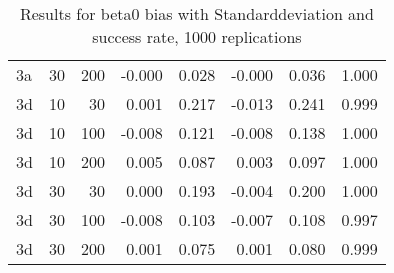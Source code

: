 \begin{table}[ht]
\begin{tabular}{lrrrrrrr}
  3a & 30 & 200 & -0.000 & 0.028 & -0.000 & 0.036 & 1.000 \\ 
  3d & 10 & 30 & 0.001 & 0.217 & -0.013 & 0.241 & 0.999 \\ 
  3d & 10 & 100 & -0.008 & 0.121 & -0.008 & 0.138 & 1.000 \\ 
  3d & 10 & 200 & 0.005 & 0.087 & 0.003 & 0.097 & 1.000 \\ 
  3d & 30 & 30 & 0.000 & 0.193 & -0.004 & 0.200 & 1.000 \\ 
  3d & 30 & 100 & -0.008 & 0.103 & -0.007 & 0.108 & 0.997 \\ 
  3d & 30 & 200 & 0.001 & 0.075 & 0.001 & 0.080 & 0.999 \\ 
   \hline
\end{tabular}
\caption{Results for beta0 bias with Standarddeviation and success rate, 1000 replications} 
\label{tab:beta0_bias_sd_success}
\end{table}
